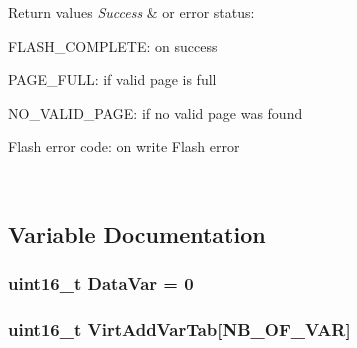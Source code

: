 \begin{DoxyRetVals}{Return values}
{\em Success} & or error status\+:
\begin{DoxyItemize}
\item F\+L\+A\+S\+H\+\_\+\+C\+O\+M\+P\+L\+E\+T\+E\+: on success
\item P\+A\+G\+E\+\_\+\+F\+U\+L\+L\+: if valid page is full
\item N\+O\+\_\+\+V\+A\+L\+I\+D\+\_\+\+P\+A\+G\+E\+: if no valid page was found
\item Flash error code\+: on write Flash error 
\end{DoxyItemize}\\
\hline
\end{DoxyRetVals}


\subsection{Variable Documentation}
\hypertarget{group___e_e_p_r_o_m___emulation_ga3d172691f05ea6e584b3d19f5900333c}{}
\subsubsection[{Data\+Var}]{\setlength{\rightskip}{0pt plus 5cm}uint16\+\_\+t Data\+Var = 0}\label{group___e_e_p_r_o_m___emulation_ga3d172691f05ea6e584b3d19f5900333c}
\hypertarget{group___e_e_p_r_o_m___emulation_ga1fb74b26daf6fdfa3dc85e4232ef4769}{}
\subsubsection[{Virt\+Add\+Var\+Tab}]{\setlength{\rightskip}{0pt plus 5cm}uint16\+\_\+t Virt\+Add\+Var\+Tab\mbox{[}{\bf N\+B\+\_\+\+O\+F\+\_\+\+V\+A\+R}\mbox{]}}\label{group___e_e_p_r_o_m___emulation_ga1fb74b26daf6fdfa3dc85e4232ef4769}

